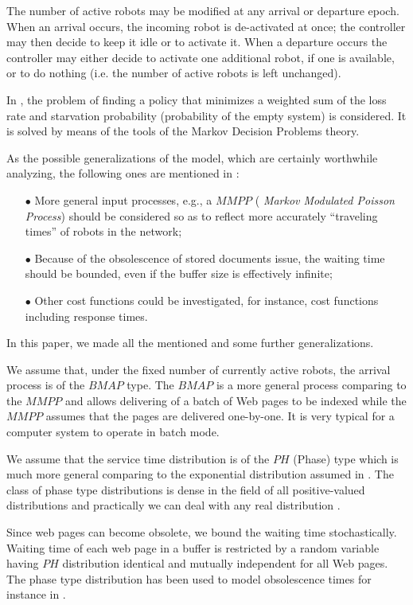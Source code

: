 \documentclass[11pt]{article}
\begin{document}
The number of active robots may be modified at any arrival or
departure epoch. When an arrival occurs, the incoming robot is
de-activated at once; the controller may then decide to keep it idle
or to activate it. When a departure occurs the controller may either
decide to activate one additional robot, if one is available, or to
do nothing (i.e. the number of active robots is left unchanged).

In \cite{tlnc}, the problem of finding a policy that minimizes a
weighted sum of the loss rate and starvation probability
(probability of the empty system) is considered. It is solved by
means of the tools of the Markov Decision Problems theory.

As the possible generalizations of the model, which are certainly
worthwhile analyzing, the following ones are mentioned in
\cite{tlnc}:
\begin{itemize}
\item[$\bullet$] More general input processes, e.g., a $MMPP$ ({\it
Markov Modulated Poisson Process}) should be considered so as to
reflect more accurately ``traveling times'' of robots in the network;
\item[$\bullet$] Because of the obsolescence of stored documents
issue, the waiting time should be bounded, even if the buffer size is
effectively infinite;
\item[$\bullet$] Other cost functions could be investigated, for
instance, cost functions including response times.
\end{itemize}

In this paper, we made all the mentioned and some further
generalizations.

We assume that, under the fixed number of currently active robots,
the arrival process is of the $BMAP$ type. The $BMAP$ is a more
general process comparing to the $MMPP$ and allows delivering of a
batch of Web pages to be indexed while the $MMPP$ assumes that the
pages are delivered one-by-one. It is very typical for a computer
system to operate in batch mode.

We assume that the service time distribution is of the $PH$ (Phase) 
type which is much more general comparing to the exponential distribution
assumed in \cite{tlnc}. The class of phase type distributions is
dense in the field of all positive-valued distributions and practically
we can deal with any real distribution \cite{ANO96}.

Since web pages can become obsolete, we bound the waiting time stochastically. 
Waiting time of each web page in a buffer is restricted by a random variable 
having $PH$ distribution identical and mutually independent for all Web pages.
The phase type distribution has been used to model obsolescence times
for instance in \cite{W87}.
\end{document}
